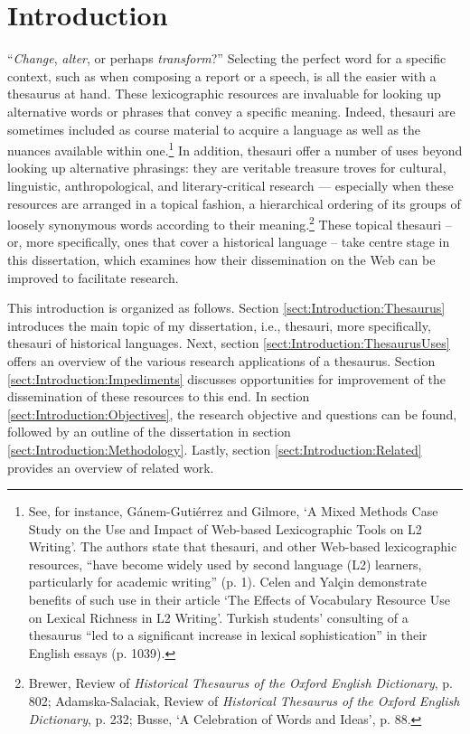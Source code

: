 

\setcounter{chapter}{0}
\chapter*{Introduction}

``\textit{Change}, \textit{alter}, or perhaps \textit{transform}?'' Selecting the perfect word for a specific context, such as when composing a report or a speech, is all the easier with a thesaurus at hand. These lexicographic resources are invaluable for looking up alternative words or phrases that convey a specific meaning. Indeed, thesauri are sometimes included as course material to acquire a language as well as the nuances available within one.\footnote{See, for instance, Gánem-Gutiérrez and Gilmore, `A Mixed Methods Case Study on the Use and Impact of Web-based Lexicographic Tools on L2 Writing'. The authors state that thesauri, and other Web-based lexicographic resources, ``have become widely used by second language (L2) learners, particularly for academic writing'' (p. 1). Celen and Yalçin demonstrate benefits of such use in their article `The Effects of Vocabulary Resource Use on Lexical Richness in L2 Writing'. Turkish students' consulting of a thesaurus ``led to a significant increase in lexical sophistication'' in their English essays (p. 1039).} In addition, thesauri offer a number of uses beyond looking up alternative phrasings: they are veritable treasure troves for cultural, linguistic, anthropological, and literary-critical research --- especially when these resources are arranged in a topical fashion, a hierarchical ordering of its groups of loosely synonymous words according to their meaning.\footnote{Brewer, Review of \textit{Historical Thesaurus of the Oxford English Dictionary}, p. 802; Adamska-Salaciak, Review of \textit{Historical Thesaurus of the Oxford English Dictionary}, p. 232; Busse, `A Celebration of Words and Ideas', p. 88.} These topical thesauri -- or, more specifically, ones that cover a historical language -- take centre stage in this dissertation, which examines how their dissemination on the Web can be improved to facilitate research.

This introduction is organized as follows. Section \ref{sect:Introduction:Thesaurus} introduces the main topic of my dissertation, i.e., thesauri, more specifically, thesauri of historical languages. Next, section \ref{sect:Introduction:ThesaurusUses} offers an overview of the various research applications of a thesaurus. Section \ref{sect:Introduction:Impediments} discusses opportunities for improvement of the dissemination of these resources to this end. In section \ref{sect:Introduction:Objectives}, the research objective and questions can be found, followed by an outline of the dissertation in section \ref{sect:Introduction:Methodology}. Lastly, section \ref{sect:Introduction:Related} provides an overview of related work.



